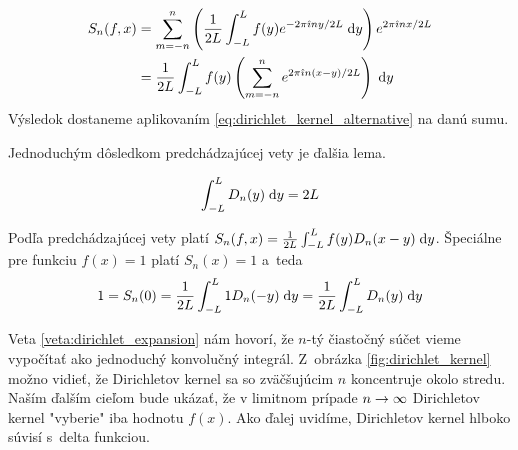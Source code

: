 \begin{dokaz}
    \begin{equation*}
    \begin{split}
        S_n(f,x) &= \sum_{m=-n}^{n} \left(
            \frac{1}{2L} \int_{-L}^{L} f(y) e^{-2\pi\hat{\imath} n y/2L} \; \mathrm{d} y
            \right) 
                e^{2\pi\hat{\imath} n x/2L} \\
            &= \frac{1}{2L} \int_{-L}^{L} f(y) \left(
                    \sum_{m=-n}^{n} e^{2\pi\hat{\imath} n (x-y)/2L}
                \right) \; \mathrm{d} y \\
    \end{split}
    \end{equation*}
    Výsledok dostaneme aplikovaním
    \eqref{eq:dirichlet_kernel_alternative} na danú sumu.
\end{dokaz}

Jednoduchým dôsledkom predchádzajúcej vety je ďalšia lema.
\begin{lema}
    \begin{equation*}
        \int_{-L}^{L} D_n(y) \; \mathrm{d} y = 2L
    \end{equation*}
\end{lema}
\begin{dokaz}
    Podľa predchádzajúcej vety platí 
    $S_n(f,x) = \frac{1}{2L} \int_{-L}^{L} f(y) D_n(x-y) \; \mathrm{d} y$.
    Špeciálne pre funkciu $f(x)=1$ platí $S_n(x)=1$ a~teda
    \begin{equation*}
        1=S_n(0) = \frac{1}{2L} \int_{-L}^{L} 1 D_n(-y) \; \mathrm{d} y =
            \frac{1}{2L} \int_{-L}^{L} D_n(y) \; \mathrm{d} y
    \end{equation*}
    \label{lema:dirichlet_kernel_integration}
\end{dokaz}

Veta \ref{veta:dirichlet_expansion} nám hovorí, že $n$-tý čiastočný
súčet vieme vypočítať ako jednoduchý konvolučný
 integrál.
Z~obrázka \ref{fig:dirichlet_kernel} možno vidieť, že
Dirichletov kernel sa so zväčšujúcim $n$ koncentruje okolo stredu.
Naším ďalším cieľom bude ukázať, že v limitnom prípade $n\rightarrow \infty$
Dirichletov kernel "vyberie" iba hodnotu $f(x)$.
Ako ďalej uvidíme, Dirichletov kernel hlboko súvisí s~delta funkciou.
